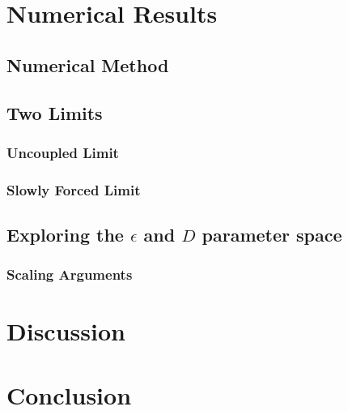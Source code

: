 \section{Numerical Results}
\subsection{Numerical Method}
\subsection{Two Limits}
\subsubsection{Uncoupled Limit}
\subsubsection{Slowly Forced Limit}
\subsection{Exploring the $\epsilon$ and $D$ parameter space}
\subsubsection{Scaling Arguments}
\section{Discussion}
\section{Conclusion}